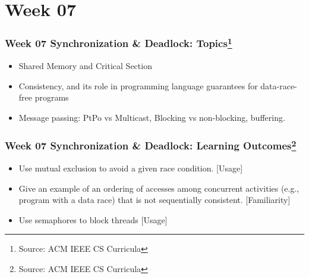 
\section{Week 07}
\begin{frame}[fragile]
\frametitle{Week 07 Synchronization \& Deadlock:
Topics\footnote{Source: ACM IEEE CS Curricula}}

\begin{itemize}
\item Shared Memory and Critical Section
\item Consistency, and its role in programming language guarantees for data-race-free programs
\item Message passing: PtPo vs Multicast, Blocking vs non-blocking, buffering.
\end{itemize}
\end{frame}

\begin{frame}[fragile]
\frametitle{Week 07 Synchronization \& Deadlock:
Learning Outcomes\footnote{Source: ACM IEEE CS Curricula}}
\begin{itemize}
\item Use mutual exclusion to avoid a given race condition. [Usage]
\item Give an example of an ordering of accesses among concurrent activities (e.g., program with a data race) that is not sequentially consistent. [Familiarity]
\item Use semaphores to block threads [Usage]
\end{itemize}

\end{frame}

